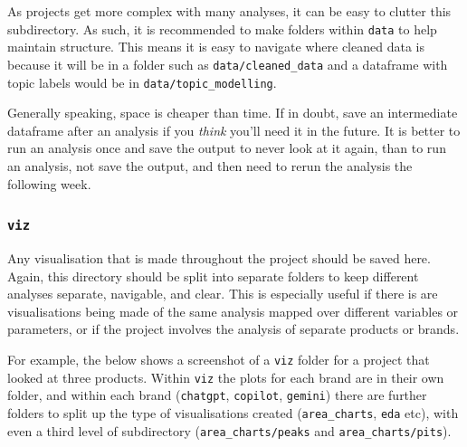 \documentclass[
  letterpaper,
  DIV=11,
  numbers=noendperiod]{scrreprt}
\begin{document}
As projects get more complex with many analyses, it can be easy to
clutter this subdirectory. As such, it is recommended to make folders
within \texttt{data} to help maintain structure. This means it is easy
to navigate where cleaned data is because it will be in a folder such as
\texttt{data/cleaned\_data} and a dataframe with topic labels would be
in \texttt{data/topic\_modelling}.

\begin{tcolorbox}[enhanced jigsaw, opacitybacktitle=0.6, breakable, title=\textcolor{quarto-callout-tip-color}{\faLightbulb}\hspace{0.5em}{Save liberally}, arc=.35mm, colframe=quarto-callout-tip-color-frame, colbacktitle=quarto-callout-tip-color!10!white, left=2mm, bottomrule=.15mm, opacityback=0, toprule=.15mm, bottomtitle=1mm, toptitle=1mm, titlerule=0mm, leftrule=.75mm, colback=white, rightrule=.15mm, coltitle=black]

Generally speaking, space is cheaper than time. If in doubt, save an
intermediate dataframe after an analysis if you \emph{think} you'll need
it in the future. It is better to run an analysis once and save the
output to never look at it again, than to run an analysis, not save the
output, and then need to rerun the analysis the following week.

\end{tcolorbox}

\subsubsection{\texorpdfstring{\texttt{viz}}{viz}}\label{viz}

Any visualisation that is made throughout the project should be saved
here. Again, this directory should be split into separate folders to
keep different analyses separate, navigable, and clear. This is
especially useful if there is are visualisations being made of the same
analysis mapped over different variables or parameters, or if the
project involves the analysis of separate products or brands.

For example, the below shows a screenshot of a \texttt{viz} folder for a
project that looked at three products. Within \texttt{viz} the plots for
each brand are in their own folder, and within each brand
(\texttt{chatgpt}, \texttt{copilot}, \texttt{gemini}) there are further
folders to split up the type of visualisations created
(\texttt{area\_charts}, \texttt{eda} etc), with even a third level of
subdirectory (\texttt{area\_charts/peaks} and
\texttt{area\_charts/pits}).
\end{document}
